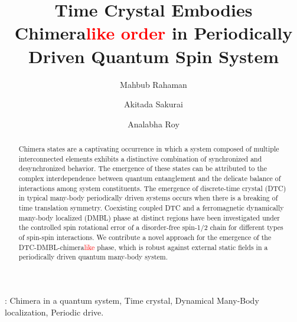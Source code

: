 \documentclass[12pt]{iopart}
\newcommand{\red}[1]{\textcolor{red}{#1}}
\begin{document}
	
\title{Time Crystal Embodies Chimera\red{like order} in Periodically Driven Quantum Spin System}
\submitto{\NJP}
\author{Mahbub Rahaman}
\address{Department of Physics, The University of Burdwan, Burdwan 713104, India}	
\author{Akitada Sakurai}
\address{Quantum Information Science and Technology Unit, Okinawa Institute of Science and Technology Graduate University, Onna-son, Okinawa 904-0495, Japan}		
\author{Analabha Roy}
\address{Department of Physics, The University of Burdwan, Burdwan 713104, India}

\begin{abstract}
	Chimera states are a captivating occurrence in which a system composed of multiple interconnected elements exhibits a distinctive combination of synchronized and desynchronized behavior. The emergence of these states can be attributed to the complex interdependence between quantum entanglement and the delicate balance of interactions among system constituents. The emergence of discrete-time crystal (DTC) in typical many-body periodically driven systems occurs when there is a breaking of time translation symmetry. Coexisting coupled DTC and a ferromagnetic dynamically many-body localized (DMBL) phase at distinct regions have been investigated under the controlled spin rotational error of a disorder-free spin-1/2 chain for different types of spin-spin interactions. We contribute a novel approach for the emergence of the DTC-DMBL-chimera\red{like} phase, which is robust against external static fields in a periodically driven quantum many-body system.
\end{abstract}
: Chimera in a quantum system, Time crystal, Dynamical Many-Body localization, Periodic drive. \\        
\maketitle
	
\end{document}
